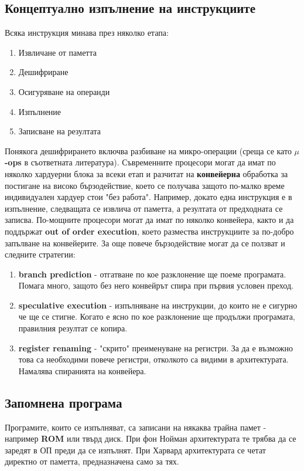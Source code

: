 \documentclass[fleqn,12pt]{article}
\begin{document}
\subsection{Концептуално изпълнение на инструкциите}
Всяка инструкция минава през няколко етапа:
\begin{enumerate}
    \item Извличане от паметта
    \item Дешифриране
    \item Осигуряване на операнди
    \item Изпълнение
    \item Записване на резултата
\end{enumerate}

Понякога дешифрирането включва разбиване на микро-операции (среща се като \textbf{$\mu$-ops} в съответната литература).
Съвременните процесори могат да имат по няколко хардуерни блока за всеки етап и разчитат на \textbf{конвейерна} обработка
за постигане на високо бързодействие, което се получава защото по-малко време индивидуален хардуер стои "без работа".
Например, докато една инструкция е в изпълнение, следващата се извлича от паметта, а резултата от предходната се записва.
По-мощните процесори могат да имат по няколко конвейера, както и да поддържат \textbf{out of order execution}, което
размества инструкциите за по-добро запълване на конвейерите. За още повече бързодействие могат да се ползват и следните стратегии:
\begin{enumerate}
    \item \textbf{branch prediction} - отгатване по кое разклонение ще поеме програмата. Помага много, защото без него конвейрът спира 
    при първия условен преход.
    \item \textbf{speculative execution} - изпълняване на инструкции, до които не е сигурно че ще се стигне. Когато е ясно по кое разклонение
    ще продължи програмата, правилния резултат се копира.
    \item \textbf{register renaming} - "скрито" преименуване на регистри. За да е възможно това са необходими повече регистри, отколкото са видими в архитектурата.
    Намалява спиранията на конвейера.
\end{enumerate} 

\subsection{Запомнена програма}
Програмите, които се изпълняват, са записани на някаква трайна памет - например \textbf{ROM} или твърд диск.
При фон Нойман архитектурата те трябва да се заредят в ОП преди да се изпълнят. При Харвард архитектурата 
се четат директно от паметта, предназначена само за тях.
\end{document}
